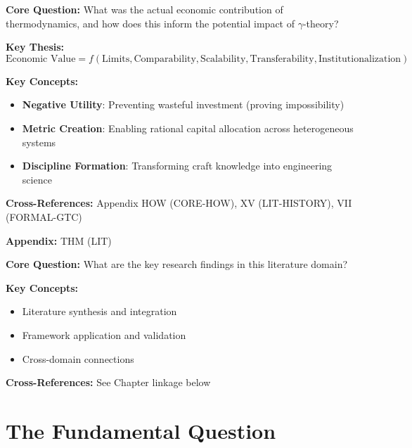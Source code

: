 \begin{tcolorbox}[colback=blue!5!white, colframe=blue!75!black,
    title=Quick Reference: Thermodynamics Economic Impact]

\textbf{Core Question:} What was the actual economic contribution of thermodynamics,
and how does this inform the potential impact of $\gamma$-theory?

\textbf{Key Thesis:}
\begin{equation}
\text{Economic Value} = f(\text{Limits}, \text{Comparability}, \text{Scalability}, \text{Transferability}, \text{Institutionalization})
\end{equation}

\textbf{Key Concepts:}
\begin{itemize}[nosep]
\item \textbf{Negative Utility}: Preventing wasteful investment (proving impossibility)
\item \textbf{Metric Creation}: Enabling rational capital allocation across heterogeneous systems
\item \textbf{Discipline Formation}: Transforming craft knowledge into engineering science
\end{itemize}

\textbf{Cross-References:} Appendix HOW (CORE-HOW), XV (LIT-HISTORY), VII (FORMAL-GTC)
\end{tcolorbox}



\begin{tcolorbox}[colback=blue!5!white, colframe=blue!75!black,
    title=Quick Reference: Appendix THM]
\textbf{Appendix:} THM (LIT)

\textbf{Core Question:} What are the key research findings in this literature domain?

\textbf{Key Concepts:}
\begin{itemize}[nosep]
\item Literature synthesis and integration
\item Framework application and validation
\item Cross-domain connections
\end{itemize}

\textbf{Cross-References:} See Chapter linkage below
\end{tcolorbox}

\section{The Fundamental Question}
\label{sec:thermo-fundamental}

